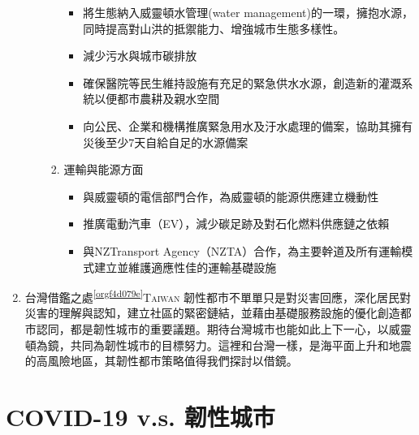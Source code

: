 \documentclass[a4paper,12pt]{article}
\begin{document}
\begin{enumerate}
\begin{enumerate}
\begin{enumerate}
\begin{itemize}
\item 將生態納入威靈頓水管理(water management)的一環，擁抱水源，同時提高對山洪的抵禦能力、增強城市生態多樣性。\\
\item 減少污水與城市碳排放\\
\item 確保醫院等民生維持設施有充足的緊急供水水源，創造新的灌溉系統以便都市農耕及親水空間\\
\item 向公民、企業和機構推廣緊急用水及汙水處理的備案，協助其擁有災後至少7天自給自足的水源備案\\
\end{itemize}
\item 運輸與能源方面
\label{sec:org04a97ab}
\begin{itemize}
\item 與威靈頓的電信部門合作，為威靈頓的能源供應建立機動性\\
\item 推廣電動汽車（EV），減少碳足跡及對石化燃料供應鏈之依賴\\
\item 與NZTransport Agency（NZTA）合作，為主要幹道及所有運輸模式建立並維護適應性佳的運輸基礎設施\\
\end{itemize}
\end{enumerate}
\end{enumerate}

\item 台灣借鑑之處\textsuperscript{\ref{orgf4d079e}}\hfill{}\textsc{Taiwan}
\label{sec:orgafd8a63}
韌性都市不單單只是對災害回應，深化居民對災害的理解與認知，建立社區的緊密鏈結，並藉由基礎服務設施的優化創造都市認同，都是韌性城市的重要議題。期待台灣城市也能如此上下一心，以威靈頓為鏡，共同為韌性城市的目標努力。這裡和台灣一樣，是海平面上升和地震的高風險地區，其韌性都市策略值得我們探討以借鏡。\\
\newpage
\end{enumerate}

\section{COVID-19 v.s. 韌性城市}
\label{sec:orgf81bff6}
\end{document}
